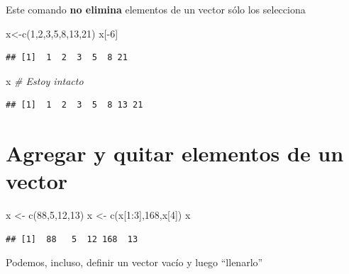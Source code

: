 \documentclass[
]{book}
\newenvironment{Shaded}{\begin{snugshade}}{\end{snugshade}}
\newcommand{\CommentTok}[1]{\textcolor[rgb]{0.56,0.35,0.01}{\textit{#1}}}
\newcommand{\DecValTok}[1]{\textcolor[rgb]{0.00,0.00,0.81}{#1}}
\newcommand{\FunctionTok}[1]{\textcolor[rgb]{0.00,0.00,0.00}{#1}}
\newcommand{\NormalTok}[1]{#1}
\newcommand{\OtherTok}[1]{\textcolor[rgb]{0.56,0.35,0.01}{#1}}
\newcommand{\SpecialCharTok}[1]{\textcolor[rgb]{0.00,0.00,0.00}{#1}}
\begin{document}
Este comando \textbf{no elimina} elementos de un vector sólo los selecciona

\begin{Shaded}
\begin{Highlighting}[]
\NormalTok{x}\OtherTok{\textless{}{-}}\FunctionTok{c}\NormalTok{(}\DecValTok{1}\NormalTok{,}\DecValTok{2}\NormalTok{,}\DecValTok{3}\NormalTok{,}\DecValTok{5}\NormalTok{,}\DecValTok{8}\NormalTok{,}\DecValTok{13}\NormalTok{,}\DecValTok{21}\NormalTok{)}
\NormalTok{x[}\SpecialCharTok{{-}}\DecValTok{6}\NormalTok{] }
\end{Highlighting}
\end{Shaded}

\begin{verbatim}
## [1]  1  2  3  5  8 21
\end{verbatim}

\begin{Shaded}
\begin{Highlighting}[]
\NormalTok{x     }\CommentTok{\# Estoy intacto}
\end{Highlighting}
\end{Shaded}

\begin{verbatim}
## [1]  1  2  3  5  8 13 21
\end{verbatim}

\hypertarget{agregar-y-quitar-elementos-de-un-vector}{%
\section{Agregar y quitar elementos de un vector}\label{agregar-y-quitar-elementos-de-un-vector}}

\begin{Shaded}
\begin{Highlighting}[]
\NormalTok{x }\OtherTok{\textless{}{-}} \FunctionTok{c}\NormalTok{(}\DecValTok{88}\NormalTok{,}\DecValTok{5}\NormalTok{,}\DecValTok{12}\NormalTok{,}\DecValTok{13}\NormalTok{)}
\NormalTok{x }\OtherTok{\textless{}{-}} \FunctionTok{c}\NormalTok{(x[}\DecValTok{1}\SpecialCharTok{:}\DecValTok{3}\NormalTok{],}\DecValTok{168}\NormalTok{,x[}\DecValTok{4}\NormalTok{]) }
\NormalTok{x}
\end{Highlighting}
\end{Shaded}

\begin{verbatim}
## [1]  88   5  12 168  13
\end{verbatim}

Podemos, incluso, definir un vector vacío y luego ``llenarlo''
\end{document}
